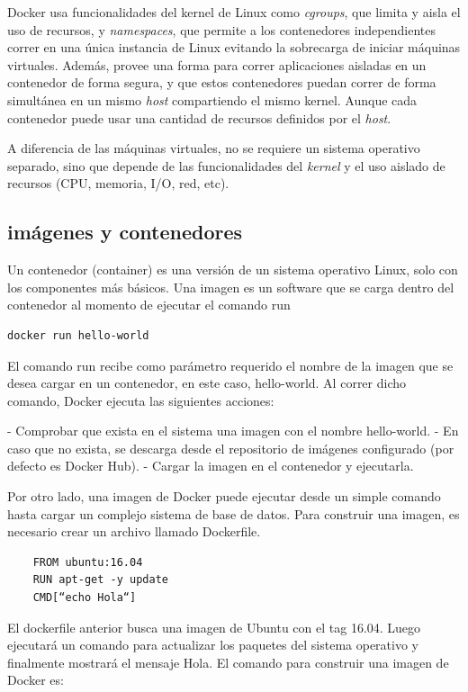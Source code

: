Docker usa funcionalidades del kernel de Linux como \textit{cgroups}, que limita y aisla el uso de recursos, y \textit{namespaces}, que permite a los contenedores independientes correr en una única instancia de Linux evitando la sobrecarga de iniciar máquinas virtuales.
Además, provee una forma para correr aplicaciones aisladas en un contenedor de forma segura, y que estos contenedores puedan correr de forma simultánea en un mismo \textit{host} compartiendo el mismo kernel. Aunque cada contenedor puede usar una cantidad de recursos definidos por el \textit{host}.

A diferencia de las máquinas virtuales, no se requiere un sistema operativo separado, sino que depende de las funcionalidades del \textit{kernel} y el uso aislado de recursos (CPU, memoria, I/O, red, etc).

\subsection[imágenes y contenedores]{imágenes y contenedores}

Un contenedor (container) es una versión de un sistema operativo Linux, solo con los componentes más básicos. Una imagen es un software que se carga dentro del contenedor al momento de ejecutar el comando run

\begin{lstlisting}[language=bash]
    docker run hello-world
\end{lstlisting}


El comando run recibe como parámetro requerido el nombre de la imagen que se desea cargar en un contenedor, en este caso, hello-world.
Al correr dicho comando, Docker ejecuta las siguientes acciones:

- Comprobar que exista en el sistema una imagen con el nombre hello-world.
- En caso que no exista, se descarga desde el repositorio de imágenes configurado (por defecto es Docker Hub).
- Cargar la imagen en el contenedor y ejecutarla.

Por otro lado, una imagen de Docker puede ejecutar desde un simple comando hasta cargar un complejo sistema de base de datos.
Para construir una imagen, es necesario crear un archivo llamado Dockerfile.

\begin{lstlisting}
    FROM ubuntu:16.04
    RUN apt-get -y update
    CMD[“echo Hola“]
\end{lstlisting}

El dockerfile anterior busca una imagen de Ubuntu con el tag 16.04. Luego ejecutará un comando para actualizar los paquetes del sistema operativo y finalmente mostrará el mensaje Hola.
El comando para construir una imagen de Docker es:

